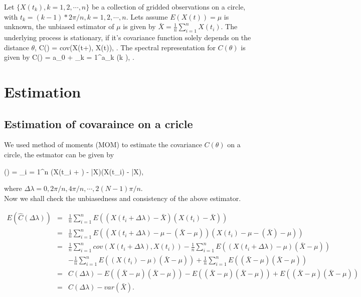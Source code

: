 Let $\{X(t_k), k = 1, 2, \cdots, n\}$ be a collection of gridded observations on a circle, with $t_k = (k-1)*2\pi/n, k = 1, 2, \cdots, n$. Lets assume $E(X(t)) = \mu$ is unknown, the unbiased estimator of $\mu$ is given by $\bar{X} = \frac{1}{n}\sum_{i=1}^{n} X(t_i)$. The underlying process is stationary, if it's covariance function solely depends on the distance $\theta$,
\beq
C(\theta) = cov(X(t+\theta), X(t)), \quad \quad \theta \in [0, \pi].
\eeq
The spectral representation for $C(\theta)$ is given by
\beq
C(\theta) = a_0 + \sum_{k = 1}^\infty a_k \cos(k \theta), \quad \theta \in [0, \pi].
\eeq 

\section{Estimation}

\subsection{Estimation of covaraince on a cricle}

We used method of moments (MOM) to estimate the covariance $C(\theta)$ on a circle, the estmator can be given by

\beq
{}(\Delta \lambda) = \sum_{i = 1}^n (X(t_i + \Delta \lambda) - \bar{X})(X(t_i) - \bar{X}), 
\eeq

where $\Delta \lambda = 0, 2\pi/n, 4\pi/n, \cdots, 2(N-1)\pi/n$.\\

Now we shall check the unbiasedness and consistency of the above estimator.

\begin{eqnarray}
	\nonumber
	E(\hat{C}(\Delta \lambda)) &=& \frac{1}{n}\sum_{i = 1}^n E((X(t_i + \Delta \lambda) - \bar{X})(X(t_i) - \bar{X})) \\ \nonumber
	&=& \frac{1}{n}\sum_{i = 1}^n E((X(t_i + \Delta \lambda) - \mu - (\bar{X} - \mu))(X(t_i) -\mu - (\bar{X}) - \mu)) \\ \nonumber
	&=& \frac{1}{n}\sum_{i=1}^n cov(X(t_i+\Delta \lambda), X(t_i)) - \frac{1}{n}\sum_{i = 1}^n E((X(t_i + \Delta \lambda) - \mu)(\bar{X} - \mu)) \\ \nonumber
	& & -\frac{1}{n}\sum_{i = 1}^n E((X(t_i) - \mu)(\bar{X} - \mu)) + \frac{1}{n}\sum_{i = 1}^n E((\bar{X} - \mu)(\bar{X} - \mu)) \\ \nonumber
	&=& C(\Delta \lambda) -E((\bar{X} - \mu)(\bar{X} - \mu)) - E((\bar{X} - \mu)(\bar{X} - \mu)) + E((\bar{X} - \mu)(\bar{X} - \mu)) \\ 
	&=& C(\Delta \lambda) - var(\bar{X}).
\end{eqnarray}

